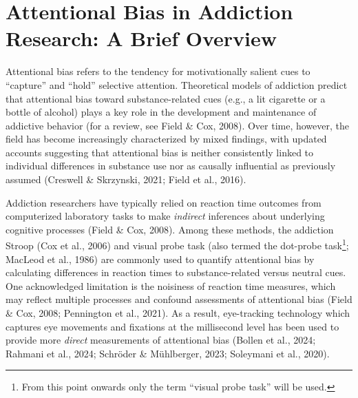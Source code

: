 \documentclass[authordate, reflection, issue]{jote-new-article}
\author[1]{\mbox{Amber Copeland\orcid{0000-0003-4634-3343}}}
\affil[1]{University of Sheffield, Sheffield, England}
\begin{document}
\begin{frontmatter}
  \maketitle
  \begin{abstract}
    \printabstracttext
  \end{abstract}
\end{frontmatter}



	\section{Attentional Bias in Addiction Research: A Brief Overview}



	Attentional bias refers to the tendency for motivationally salient cues to “capture” and “hold”\emph{ }selective attention. Theoretical models of addiction predict that attentional bias toward substance-related cues (e.g., a lit cigarette or a bottle of alcohol) plays a key role in the development and maintenance of addictive behavior (for a review, see Field \& Cox, 2008). Over time, however, the field has become increasingly characterized by mixed findings, with updated accounts suggesting that attentional bias is neither consistently linked to individual differences in substance use nor as causally influential as previously assumed (Creswell \& Skrzynski, 2021; Field et al., 2016).



	Addiction researchers have typically relied on reaction time outcomes from computerized laboratory tasks to make \emph{indirect} inferences about underlying cognitive processes (Field \& Cox, 2008). Among these methods, the addiction Stroop (Cox et al., 2006) and visual probe task (also termed the dot-probe task\footnote{ From this point onwards only the term “visual probe task” will be used.}; MacLeod et al., 1986) are commonly used to quantify attentional bias by calculating differences in reaction times to substance-related versus neutral cues. One acknowledged limitation is the noisiness of reaction time measures, which may reflect multiple processes and confound assessments of attentional bias (Field \& Cox, 2008; Pennington et al., 2021). As a result, eye-tracking technology which captures eye movements and fixations at the millisecond level has been used to provide more \emph{direct }measurements of attentional bias (Bollen et al., 2024; Rahmani et al., 2024; Schröder \& Mühlberger, 2023; Soleymani et al., 2020).
\end{document}
